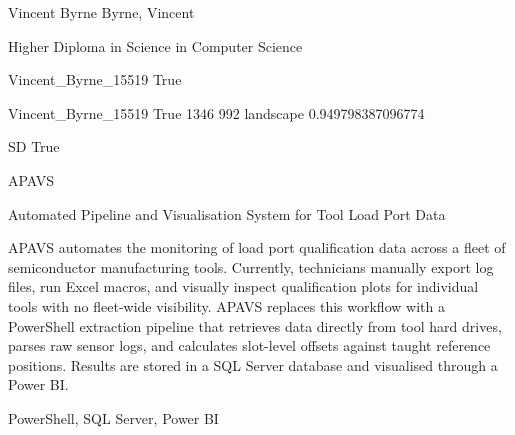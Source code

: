 
\begingroup{}\relax



\def\Key{Vincent_Byrne_15519}

{Vincent Byrne}
{Byrne, Vincent}

{Higher Diploma in Science in Computer Science}

{Vincent_Byrne_15519}
{True}

{Vincent_Byrne_15519}
{True}
{1346}
{992}
{landscape}
{0.949798387096774}

{SD}
{True}

{APAVS}

{Automated Pipeline and Visualisation System for Tool Load Port Data}

{APAVS automates the monitoring of load port qualification data across a fleet of semiconductor manufacturing tools. Currently, technicians manually export log files, run Excel macros, and visually inspect qualification plots for individual tools with no fleet-wide visibility. APAVS replaces this workflow with a PowerShell extraction pipeline that retrieves data directly from tool hard drives, parses raw sensor logs, and calculates slot-level offsets against taught reference positions. Results are stored in a SQL Server database and visualised through a Power BI.}

{PowerShell, SQL Server, Power BI}


